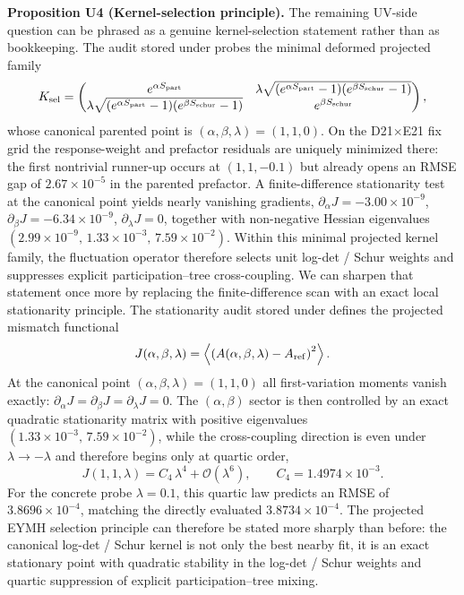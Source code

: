 \documentclass[aps,prd,onecolumn,notitlepage,nofootinbib,superscriptaddress,11pt,floatfix]{revtex4-2}
\begin{document}
\medskip\noindent\textbf{Proposition U4 (Kernel-selection principle).}
The remaining UV-side question can be phrased as a genuine kernel-selection statement rather than as bookkeeping. The audit stored under  probes the minimal deformed projected family
\[
K_{\rm sel}=
\begin{pmatrix}
e^{\alpha S_{\rm part}} &
\lambda\sqrt{(e^{\alpha S_{\rm part}}-1)(e^{\beta S_{\rm schur}}-1)} \\
\lambda\sqrt{(e^{\alpha S_{\rm part}}-1)(e^{\beta S_{\rm schur}}-1)} &
e^{\beta S_{\rm schur}}
\end{pmatrix},
\]
whose canonical parented point is $(\alpha,\beta,\lambda)=(1,1,0)$. On the D21$\times$E21 fix grid the response-weight and prefactor residuals are uniquely minimized there: the first nontrivial runner-up occurs at $(1,1,-0.1)$ but already opens an RMSE gap of $2.67\times10^{-5}$ in the parented prefactor. A finite-difference stationarity test at the canonical point yields nearly vanishing gradients, $\partial_\alpha J=-3.00\times10^{-9}$, $\partial_\beta J=-6.34\times10^{-9}$, $\partial_\lambda J=0$, together with non-negative Hessian eigenvalues $(2.99\times10^{-9},\,1.33\times10^{-3},\,7.59\times10^{-2})$. Within this minimal projected kernel family, the fluctuation operator therefore selects unit log-det / Schur weights and suppresses explicit participation--tree cross-coupling.
We can sharpen that statement once more by replacing the finite-difference scan with an exact local stationarity principle. The stationarity audit stored under  defines the projected mismatch functional
\[
J(\alpha,\beta,\lambda)=\left\langle\left(A(\alpha,\beta,\lambda)-A_{\rm ref}\right)^2\right\rangle .
\]
At the canonical point $(\alpha,\beta,\lambda)=(1,1,0)$ all first-variation moments vanish exactly: $\partial_\alpha J=\partial_\beta J=\partial_\lambda J=0$. The $(\alpha,\beta)$ sector is then controlled by an exact quadratic stationarity matrix with positive eigenvalues $(1.33\times10^{-3},\,7.59\times10^{-2})$, while the cross-coupling direction is even under $\lambda\to-\lambda$ and therefore begins only at quartic order,
\[
J(1,1,\lambda)=C_4\,\lambda^4+\mathcal{O}(\lambda^6),
\qquad
C_4=1.4974\times10^{-3}.
\]
For the concrete probe $\lambda=0.1$, this quartic law predicts an RMSE of $3.8696\times10^{-4}$, matching the directly evaluated $3.8734\times10^{-4}$. The projected EYMH selection principle can therefore be stated more sharply than before: the canonical log-det / Schur kernel is not only the best nearby fit, it is an exact stationary point with quadratic stability in the log-det / Schur weights and quartic suppression of explicit participation--tree mixing.
\end{document}
